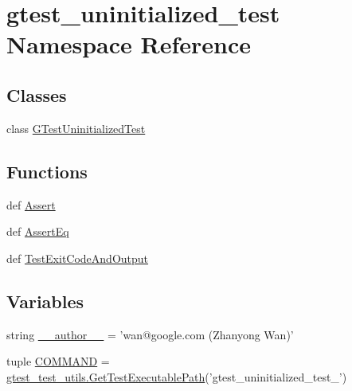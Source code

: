 \hypertarget{namespacegtest__uninitialized__test}{\section{gtest\-\_\-uninitialized\-\_\-test \-Namespace \-Reference}
\label{d0/d3d/namespacegtest__uninitialized__test}
}
\subsection*{\-Classes}
\begin{DoxyCompactItemize}
\item 
class \hyperlink{classgtest__uninitialized__test_1_1GTestUninitializedTest}{\-G\-Test\-Uninitialized\-Test}
\end{DoxyCompactItemize}
\subsection*{\-Functions}
\begin{DoxyCompactItemize}
\item 
def \hyperlink{namespacegtest__uninitialized__test_ab32cfcfbc956a0144af3195ea69705b1}{\-Assert}
\item 
def \hyperlink{namespacegtest__uninitialized__test_a146e8238c753828bcf35a9fcfd0dadf5}{\-Assert\-Eq}
\item 
def \hyperlink{namespacegtest__uninitialized__test_a32855a192af70f4ace8c07fee8d8a7ef}{\-Test\-Exit\-Code\-And\-Output}
\end{DoxyCompactItemize}
\subsection*{\-Variables}
\begin{DoxyCompactItemize}
\item 
string \hyperlink{namespacegtest__uninitialized__test_a629d61dfe4da763164a4d1a2d85b0afd}{\-\_\-\-\_\-author\-\_\-\-\_\-} = 'wan@google.\-com (\-Zhanyong \-Wan)'
\item 
tuple \hyperlink{namespacegtest__uninitialized__test_add010199942a26d17bd560c1ce462eeb}{\-C\-O\-M\-M\-A\-N\-D} = \hyperlink{namespacegtest__test__utils_a1bdf3cac86afa675ed37629b183048e9}{gtest\-\_\-test\-\_\-utils.\-Get\-Test\-Executable\-Path}('gtest\-\_\-uninitialized\-\_\-test\-\_\-')
\end{DoxyCompactItemize}



